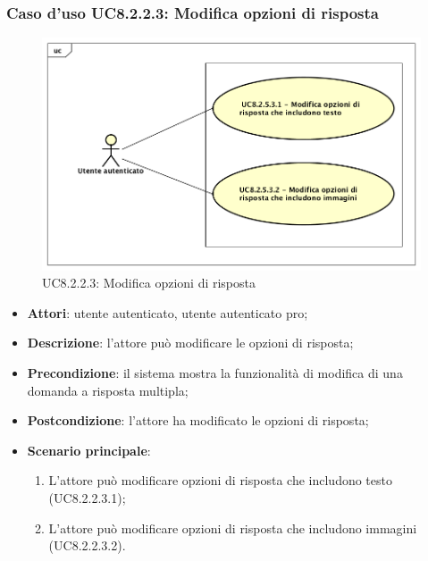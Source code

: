 \subsubsection{Caso d'uso UC8.2.2.3: Modifica opzioni di risposta}
	\label{UC8.2.2.3}
	\begin{figure}[h]
		\centering
			\includegraphics[scale=0.45,keepaspectratio]{UML/UC8_2_2_3.png}
		\caption{UC8.2.2.3: Modifica opzioni di risposta}
	\end{figure}
	\FloatBarrier
	\begin{itemize}
		\item
			\textbf{Attori}: utente autenticato, utente autenticato pro;
		\item		
			\textbf{Descrizione}: l'attore può modificare le opzioni di risposta;
		\item
			\textbf{Precondizione}: il sistema mostra la funzionalità di modifica di una domanda a risposta multipla;
		\item
			\textbf{Postcondizione}: l'attore ha modificato le opzioni di risposta;
		\item
			\textbf{Scenario principale}:
	       		\begin{enumerate}
	       			\item
	       			L'attore può modificare opzioni di risposta che includono testo (UC8.2.2.3.1);
					\item
					L'attore può modificare opzioni di risposta che includono immagini (UC8.2.2.3.2).
	 			\end{enumerate}
	\end{itemize}	
	
